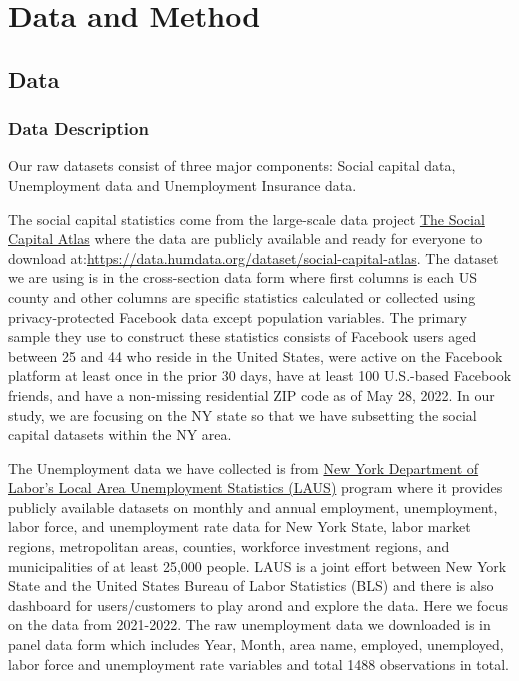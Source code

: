 \documentclass{article}
\begin{document}
\section{Data and Method}

\subsection{Data}

\subsubsection{Data Description}

Our raw datasets consist of three major components: Social capital data, Unemployment data and Unemployment Insurance data.


The social capital statistics come from the large-scale data project \href{https://socialcapital.org}{The Social Capital Atlas} where the data are publicly available and ready for everyone to download at:\url{https://data.humdata.org/dataset/social-capital-atlas}. The dataset we are using is in the cross-section data form where first columns is each US county and other columns are specific statistics calculated or collected using privacy-protected Facebook data except population variables. The primary sample they use to construct these statistics consists of Facebook users aged between 25 and 44 who reside in the United States, were active on the Facebook platform at least once in the prior 30 days, have at least 100 U.S.-based Facebook friends, and have a non-missing residential ZIP code as of May 28, 2022. In our study, we are focusing on the NY state so that we have subsetting the social capital datasets within the NY area.

The Unemployment data we have collected is from \href{https://dol.ny.gov/local-area-unemployment-statistics}{New York Department of Labor's Local Area Unemployment Statistics (LAUS)} program where it provides publicly available datasets on monthly and annual employment, unemployment, labor force, and unemployment rate data for New York State, labor market regions, metropolitan areas, counties, workforce investment regions, and municipalities of at least 25,000 people. LAUS is a joint effort between New York State and the United States Bureau of Labor Statistics (BLS) and there is also dashboard for users/customers to play arond and explore the data. Here we focus on the data from 2021-2022. The raw unemployment data we downloaded is in panel data form which includes Year, Month, area name, employed, unemployed, labor force and unemployment rate variables and total 1488 observations in total. 
\end{document}
